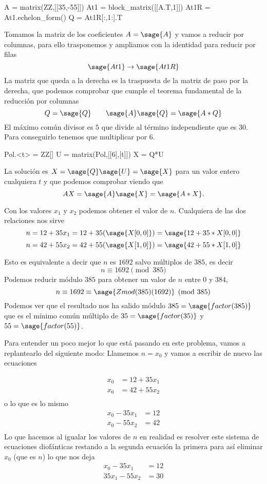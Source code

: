 \documentclass{amsart}
\begin{document}
\begin{sageblock}
A = matrix(ZZ,[[35,-55]])
At1 = block_matrix([[A.T,1]])
At1R = At1.echelon_form()
Q = At1R[:,1:].T
\end{sageblock}

Tomamos la matriz de los coeficientes $A = \sage{A}$ y vamos a reducir por
columnas, para ello trasponemos y ampliamos con la identidad para reducir por
filas
$$ \sage{At1} \to \sage{At1R}$$
La matriz que queda a la derecha es la traspuesta de la matriz de paso por la
derecha, que podemos comprobar que cumple el teorema fundamental de la 
reducción por columnas
$$ Q = \sage{Q} \qquad \sage{A} \sage{Q} = \sage{A*Q}$$
El máximo común divisor es $5$ que divide al término independiente que es $30$.
Para conseguirlo tenemos que multiplicar por $6$. 

\begin{sageblock}
Pol.<t> = ZZ[]
U = matrix(Pol,[[6],[t]])
X = Q*U
\end{sageblock}

La solución es $X = \sage{Q} \sage{U} = \sage{X}$ para un valor entero
cualquiera $t$ y que podemos comprobar
viendo que $$AX = \sage{A} \sage{X} = \sage{A*X}.$$

Con los valores $x_1$ y $x_2$ podemos obtener el valor de $n$. Cualquiera
de las dos relaciones nos sirve
$$ n = 12+35x_1 = 12+35(\sage{X[0,0]}) = \sage{12+35*X[0,0]} $$
$$ n = 42+55x_2 = 42+55(\sage{X[1,0]}) = \sage{42+55*X[1,0]} $$

Esto es equivalente a decir que $n$ es $1692$ salvo múltiplos de $385$, es
decir
$$ n \equiv 1692 \pmod{385}$$
Podemos reducir módulo $385$ para obtener un valor de $n$ entre $0$ y $384$,
$$ n \equiv 1692 \equiv \sage{Zmod(385)(1692)} \pmod{385} $$
Podemos ver que el resultado nos ha salido módulo $385 = \sage{factor(385)}$
que es el mínimo común múltiplo de $35 = \sage{factor(35)}$ y $55 = 
\sage{factor(55)}$.

Para entender un poco mejor lo que está pasando en este problema, vamos
a replantearlo del siguiente modo: Llamemos $n = x_0$ y vamos a escribir
de nuevo las ecuaciones

\begin{align*}
x_0 &= 12+35x_1 \\
x_0 &= 42+55x_2 \\
\end{align*}
o lo que es lo mismo
\begin{align*}
x_0 - 35x_1 &= 12 \\
x_0 - 55 x_2 &= 42 \\
\end{align*}
Lo que hacemos al igualar los valores de $n$ en realidad es resolver 
este sistema de ecuaciones diofánticas restando a la segunda ecuación
la primera para así eliminar $x_0$ (que es $n$) lo que nos deja
\begin{align*}
x_0 - 35x_1 &= 12 \\
35x_1 - 55 x_2 &= 30 \\
\end{align*}
\end{document}
